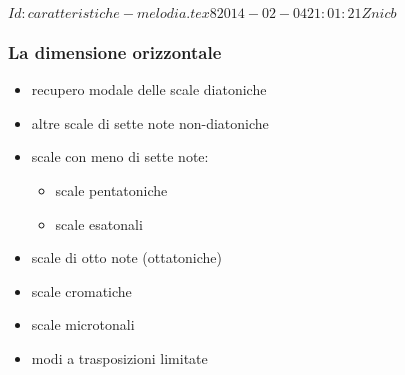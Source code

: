 %
%
\svnInfo $Id: caratteristiche-melodia.tex 8 2014-02-04 21:01:21Z nicb $


\begin{frame}
    \frametitle{La dimensione orizzontale}

    \begin{itemize}
        \item recupero modale delle scale diatoniche
        \item altre scale di sette note non-diatoniche
        \item scale con meno di sette note:

            \begin{itemize}
            
                \item scale pentatoniche
                \item scale esatonali

            \end{itemize}

          \item scale di otto note (ottatoniche)
          \item scale cromatiche
          \item scale microtonali
          \item modi a trasposizioni limitate

        \end{itemize}

\end{frame}

